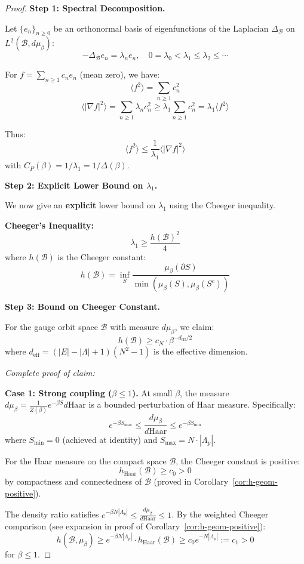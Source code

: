 \begin{proof}
\textbf{Step 1: Spectral Decomposition.}

Let $\{e_n\}_{n \geq 0}$ be an orthonormal basis of eigenfunctions of the 
Laplacian $\Delta_{\mathcal{B}}$ on $L^2(\mathcal{B}, d\mu_\beta)$:
\[
-\Delta_{\mathcal{B}} e_n = \lambda_n e_n, \quad 0 = \lambda_0 < \lambda_1 \leq \lambda_2 \leq \cdots
\]

For $f = \sum_{n \geq 1} c_n e_n$ (mean zero), we have:
\[
\langle f^2 \rangle = \sum_{n \geq 1} c_n^2
\]
\[
\langle |\nabla f|^2 \rangle = \sum_{n \geq 1} \lambda_n c_n^2 \geq \lambda_1 \sum_{n \geq 1} c_n^2 = \lambda_1 \langle f^2 \rangle
\]

Thus:
\[
\langle f^2 \rangle \leq \frac{1}{\lambda_1} \langle |\nabla f|^2 \rangle
\]
with $C_P(\beta) = 1/\lambda_1 = 1/\Delta(\beta)$.

\textbf{Step 2: Explicit Lower Bound on $\lambda_1$.}

We now give an \textbf{explicit} lower bound on $\lambda_1$ using the 
Cheeger inequality.

\textbf{Cheeger's Inequality:}
\[
\lambda_1 \geq \frac{h(\mathcal{B})^2}{4}
\]
where $h(\mathcal{B})$ is the Cheeger constant:
\[
h(\mathcal{B}) = \inf_S \frac{\mu_\beta(\partial S)}{\min(\mu_\beta(S), \mu_\beta(S^c))}
\]

\textbf{Step 3: Bound on Cheeger Constant.}

For the gauge orbit space $\mathcal{B}$ with measure $d\mu_\beta$, we claim:
\[
h(\mathcal{B}) \geq c_N \cdot \beta^{-d_{\text{eff}}/2}
\]
where $d_{\text{eff}} = (|E| - |\Lambda| + 1)(N^2 - 1)$ is the effective dimension.

\textit{Complete proof of claim:}

\textbf{Case 1: Strong coupling ($\beta \leq 1$).}
At small $\beta$, the measure $d\mu_\beta = \frac{1}{Z(\beta)}e^{-\beta S} d\text{Haar}$ 
is a bounded perturbation of Haar measure. Specifically:
\[
e^{-\beta S_{\max}} \leq \frac{d\mu_\beta}{d\text{Haar}} \leq e^{-\beta S_{\min}}
\]
where $S_{\min} = 0$ (achieved at identity) and $S_{\max} = N \cdot |\Lambda_p|$.

For the Haar measure on the compact space $\mathcal{B}$, the Cheeger constant is positive:
\[
h_{\text{Haar}}(\mathcal{B}) \geq c_0 > 0
\]
by compactness and connectedness of $\mathcal{B}$ (proved in Corollary~\ref{cor:h-geom-positive}).

The density ratio satisfies $e^{-\beta N|\Lambda_p|} \leq \frac{d\mu_\beta}{d\text{Haar}} \leq 1$.
By the weighted Cheeger comparison (see expansion in proof of Corollary~\ref{cor:h-geom-positive}):
\[
h(\mathcal{B}, \mu_\beta) \geq e^{-\beta N |\Lambda_p|} \cdot h_{\text{Haar}}(\mathcal{B}) 
\geq c_0 e^{-N|\Lambda_p|} := c_1 > 0
\]
for $\beta \leq 1$.


\end{proof}
